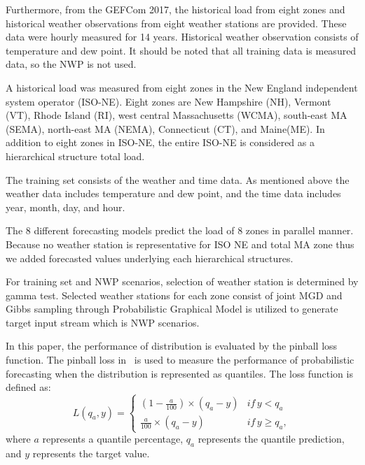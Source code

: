 \documentclass[journal]{IEEEtran} %
\begin{document}
Furthermore, from the GEFCom 2017, the historical load from eight zones and historical weather observations from eight weather stations are provided. These data were hourly measured for 14 years. Historical weather observation consists of temperature and dew point. It should be noted that all training data is measured data, so the NWP is not used. 

A historical load was measured from eight zones in the New England independent system operator (ISO-NE). Eight zones are New Hampshire (NH), Vermont (VT), Rhode Island (RI), west central Massachusetts (WCMA), south-east MA (SEMA), north-east MA (NEMA), Connecticut (CT), and Maine(ME). In addition to eight zones in ISO-NE, the entire ISO-NE is considered as a hierarchical structure total load.

The training set consists of the weather and time data. As mentioned above the weather data includes temperature and dew point, and the time data includes year, month, day, and hour. 

The 8 different forecasting models predict the load of 8 zones in parallel manner. Because no weather station is representative for ISO NE and total MA zone thus we added forecasted values underlying each hierarchical structures. 

For training set and NWP scenarios, selection of weather station is determined by gamma test. Selected weather stations for each zone consist of joint MGD and Gibbs sampling through Probabilistic Graphical Model is utilized to generate target input stream which is NWP scenarios.


 In this paper, the performance of distribution is evaluated by the pinball loss function. The pinball loss in~\cite{Hong2016} is used to measure the performance of probabilistic forecasting when the distribution is represented as quantiles. The loss function is defined as:
\begin{equation}
L({q_a},y) = \left\{ {\begin{array}{*{20}{c}}
  {(1 - \frac{a}{{100}}) \times ({q_a} - y)}&{if\,y < {q_a}} \\ 
  {\frac{a}{{100}} \times ({q_a} - y)}&{if\,y \geq {q_a}},
\end{array}} \right.
\end{equation}
where $a$ represents a quantile percentage, $q_a$ represents the quantile prediction, and $y$ represents the target value.
\end{document}
